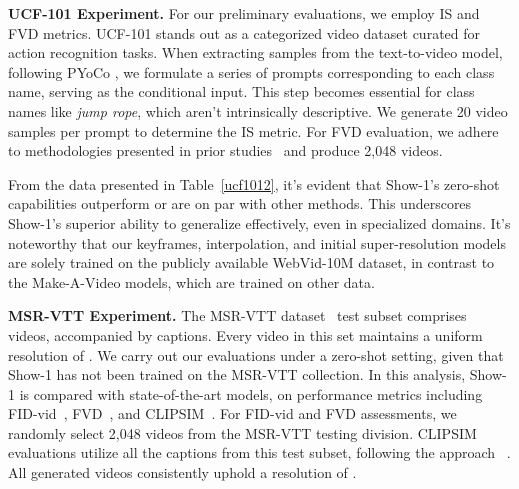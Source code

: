 \documentclass{article} \usepackage{iclr2024_conference,times}
\begin{document}
\noindent\textbf{UCF-101 Experiment.} For our preliminary evaluations, we employ IS and FVD metrics. UCF-101 stands out as a categorized video dataset curated for action recognition tasks. When extracting samples from the text-to-video model, following PYoCo \citep{ge2023preserve}, we formulate a series of prompts corresponding to each class name, serving as the conditional input. This step becomes essential for class names like \textit{jump rope}, which aren't intrinsically descriptive.  We generate 20 video samples per prompt to determine the IS metric. For FVD evaluation, we adhere to methodologies presented in prior studies~\citep{le2021ccvs,tian2021a} and produce 2,048 videos.

From the data presented in Table~\ref{ucf1012}, it's evident that Show-1's zero-shot capabilities outperform or are on par with other methods. This underscores Show-1's superior ability to generalize effectively, even in specialized domains. It's noteworthy that our keyframes, interpolation, and initial super-resolution models are solely trained on the publicly available WebVid-10M dataset, in contrast to the Make-A-Video models, which are trained on other data.


\noindent\textbf{MSR-VTT Experiment.}
The MSR-VTT dataset~\citep{xu2016msr} test subset comprises  videos, accompanied by  captions. Every video in this set maintains a uniform resolution of . We carry out our evaluations under a zero-shot setting, given that Show-1 has not been trained on the MSR-VTT collection. In this analysis, Show-1 is compared with state-of-the-art models, on performance metrics including FID-vid~\citep{heusel2017gans_nash_equilibrium}, FVD~\citep{unterthiner2018FVD}, and CLIPSIM~\citep{wu2021godiva}. For FID-vid and FVD assessments, we randomly select 2,048 videos from the MSR-VTT testing division. CLIPSIM evaluations utilize all the captions from this test subset, following the approach ~\citep{singer2022make}. All generated videos consistently uphold a resolution of .
\end{document}
